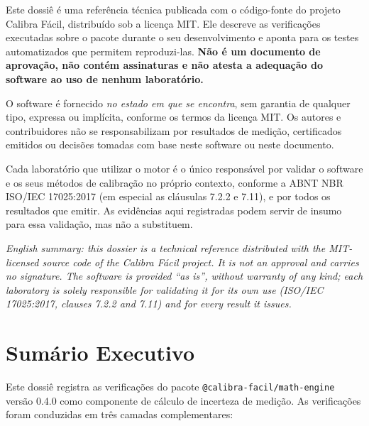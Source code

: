 \documentclass[11pt,a4paper]{article}
\newcommand{\docVersion}{0.4.0}
\begin{document}
Este dossiê é uma referência técnica publicada com o código-fonte do projeto Calibra Fácil, distribuído sob a licença MIT. Ele descreve as verificações executadas sobre o pacote durante o seu desenvolvimento e aponta para os testes automatizados que permitem reproduzi-las. \textbf{Não é um documento de aprovação, não contém assinaturas e não atesta a adequação do software ao uso de nenhum laboratório.}

O software é fornecido \emph{no estado em que se encontra}, sem garantia de qualquer tipo, expressa ou implícita, conforme os termos da licença MIT. Os autores e contribuidores não se responsabilizam por resultados de medição, certificados emitidos ou decisões tomadas com base neste software ou neste documento.

Cada laboratório que utilizar o motor é o único responsável por validar o software e os seus métodos de calibração no próprio contexto, conforme a ABNT NBR ISO/IEC 17025:2017 (em especial as cláusulas 7.2.2 e 7.11), e por todos os resultados que emitir. As evidências aqui registradas podem servir de insumo para essa validação, mas não a substituem.

\vspace{0.2cm}
{\small\itshape English summary: this dossier is a technical reference distributed with the MIT-licensed source code of the Calibra Fácil project. It is not an approval and carries no signature. The software is provided ``as is'', without warranty of any kind; each laboratory is solely responsible for validating it for its own use (ISO/IEC 17025:2017, clauses 7.2.2 and 7.11) and for every result it issues.}

\tableofcontents

\clearpage

\section{Sumário Executivo}

Este dossiê registra as verificações do pacote \texttt{@calibra-facil/math-engine} versão \docVersion{} como componente de cálculo de incerteza de medição. As verificações foram conduzidas em três camadas complementares:
\end{document}
